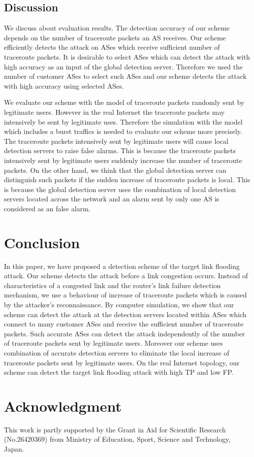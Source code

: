 \documentclass[conference]{IEEEtran}
\begin{document}
  \subsection{Discussion}
    We discuss about evaluation results.
    The detection accuracy of our scheme depends on the number of traceroute packets an AS receives.
    Our scheme efficiently detects the attack on ASes which receive sufficient number of traceroute packets.
    It is desirable to select ASes which can detect the attack with high accuracy as an input of the global detection server.
    Therefore we used the number of customer ASes to select such ASes and our scheme detects the attack with high accuracy using selected ASes.
      
    We evaluate our scheme with the model of traceroute packets randomly sent by legitimate users.
    However in the real Internet the traceroute packets may intensively be sent by legitimate uses.
    Therefore the simulation with the model which includes a burst traffics is needed to evaluate our scheme more precisely.
    The traceroute packets intensively sent by legitimate users will cause local detection servers to raise false alarms.
    This is because the traceroute packets intensively sent by legitimate users suddenly increase the number of traceroute packets.
    On the other hand, we think that the global detection server can distinguish such packets if the sudden increase of traceroute packets is local.
    This is because the global detection server uses the combination of local detection servers located across the network and an alarm sent by only one AS is considered as an false alarm.

  \section{Conclusion}\label{Sec:Conclusion}
    In this paper, we have proposed a detection scheme of the target link flooding attack.
    Our scheme detects the attack before a link congestion occurs.
    Instead of characteristics of a congested link and the router's link failure detection mechanism, we use a behaviour of increase of traceroute packets which is caused by the attacker's reconnaissance.
    By computer simulation, we show that our scheme can detect the attack at the detection servers located within ASes which connect to many customer ASes and receive the sufficient number of traceroute packets.
    Such accurate ASes can detect the attack independently of the number of traceroute packets sent by legitimate users.
    Moreover our scheme uses combination of accurate detection servers to eliminate the local increase of traceroute packets sent by legitimate users.
    On the real Internet topology, our scheme can detect the target link flooding attack with high TP and low FP. 

  \section*{Acknowledgment}
    This work is partly supported by the Grant in Aid for Scientific Research (No.26420369) from Ministry of Education, Sport, Science and Technology, Japan.

  
  \nocite{*}
  
  
\end{document}
